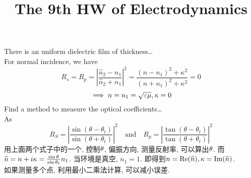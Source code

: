 \documentclass[UTF8,9pt]{ctexart}
\title{The 9th HW of Electrodynamics}
\begin{document}
 
\maketitle
{}There is an uniform dielectric film of thickness\dots\\
For normal incidence, we have
$$ R_{s}=R_{p}=\left|\frac{\hat{n}_{2}-n_{1}}{\hat{n}_{2}+n_{1}}\right|^{2}=\frac{\left(n-n_{1}\right)^{2}+\kappa^{2}}{\left(n+n_{1}\right)^{2}+\kappa^{2}} = 0$$
$$\implies n = n_1 = \sqrt{\varepsilon \mu}, \kappa =0$$
Find a method to measure the optical coefficients\dots\\
As
$$ 
R_{S}=\left|\frac{\sin \left(\theta-\theta_{t}\right)}{\sin \left(\theta+\theta_{t}\right)}\right|^{2}
\quad \text{and} \quad
R_{p}=\left|\frac{\tan \left(\theta-\theta_{t}\right)}{\tan \left(\theta+\theta_{t}\right)}\right|^{2}
 $$
用上面两个式子中的一个, 控制$\theta$, 偏振方向, 测量反射率, 可以算出$\theta$. 而$\widehat{n} = n + i\kappa = \frac{\sin\theta}{\sin\theta_t}n_1$. 当环境是真空, $n_1=1$. 即得到$n =\operatorname{Re}(\widehat{n}),\kappa = \operatorname{Im}(\widehat{n})$. \\
如果测量多个点, 利用最小二乘法计算, 可以减小误差. 
\end{document}
